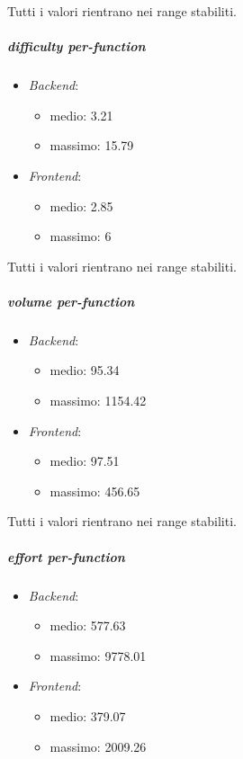 	Tutti i valori rientrano nei range stabiliti.


	\subparagraph{ difficulty per-function}
	\begin{itemize}
		\item \emph{Backend}: 
		\begin{itemize}
			\item medio: 3.21
			\item massimo: 15.79
		\end{itemize} 
		\item \emph{Frontend}: 
		\begin{itemize}
			\item medio: 2.85
			\item massimo: 6
		\end{itemize} 
	\end{itemize}

	Tutti i valori rientrano nei range stabiliti.

	
	\subparagraph{ volume per-function}
	\begin{itemize}
		\item \emph{Backend}: 
		\begin{itemize}
			\item medio: 95.34
			\item massimo: 1154.42
		\end{itemize} 
		\item \emph{Frontend}: 
		\begin{itemize}
			\item medio: 97.51
			\item massimo: 456.65
		\end{itemize} 
	\end{itemize}

	Tutti i valori rientrano nei range stabiliti.


	\subparagraph{ effort per-function}
	\begin{itemize}
		\item \emph{Backend}: 
		\begin{itemize}
			\item medio: 577.63
			\item massimo: 9778.01
		\end{itemize} 
		\item \emph{Frontend}: 
		\begin{itemize}
			\item medio: 379.07
			\item massimo: 2009.26
		\end{itemize} 
	\end{itemize}


